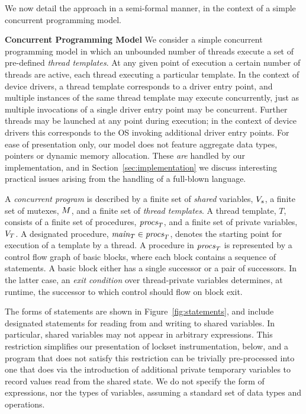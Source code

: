 We now detail the approach in a semi-formal manner, in the context of a simple concurrent programming model.

\medskip\noindent\textbf{Concurrent Programming Model }
%
We consider a simple concurrent programming model in which an unbounded number of threads execute a set of pre-defined \emph{thread templates}.  At any given point of execution a certain number of threads are active, each thread executing a particular template.  In the context of device drivers, a thread template corresponds to a driver entry point, and multiple instances of the same thread template may execute concurrently, just as multiple invocations of a single driver entry point may be concurrent.  Further threads may be launched at any point during execution; in the context of device drivers this corresponds to the OS invoking additional driver entry points.  For ease of presentation only, our model does not feature aggregate data types, pointers or dynamic memory allocation.  These \emph{are} handled by our implementation, and in Section~\ref{sec:implementation} we discuss interesting practical issues arising from the handling of a full-blown language.

A \emph{concurrent program} is described by a finite set of \emph{shared} variables, $V_s$, a finite set of mutexes, $M$, and a finite set of \emph{thread templates}.  A thread template, $T$, consists of a finite set of procedures, $\mathit{procs}_{T}$, and a finite set of private variables, $V_{T}$.  A designated procedure, $\mathit{main}_{T} \in \mathit{procs}_{T}$, denotes the starting point for execution of a template by a thread.  A procedure in $\mathit{procs}_{T}$ is represented by a control flow graph of basic blocks, where each block contains a sequence of statements.  A basic block either has a single successor or a pair of successors.  In the latter case, an \emph{exit condition} over thread-private variables determines, at runtime, the successor to which control should flow on block exit.

The forms of statements are shown in Figure~\ref{fig:statements}, and include designated statements for reading from and writing to shared variables.  In particular, shared variables may not appear in arbitrary expressions.  This restriction simplifies our presentation of lockset instrumentation, below, and a program that does not satisfy this restriction can be trivially pre-processed into one that does via the introduction of additional private temporary variables to record values read from the shared state.  We do not specify the form of expressions, nor the types of variables, assuming a standard set of data types and operations.

